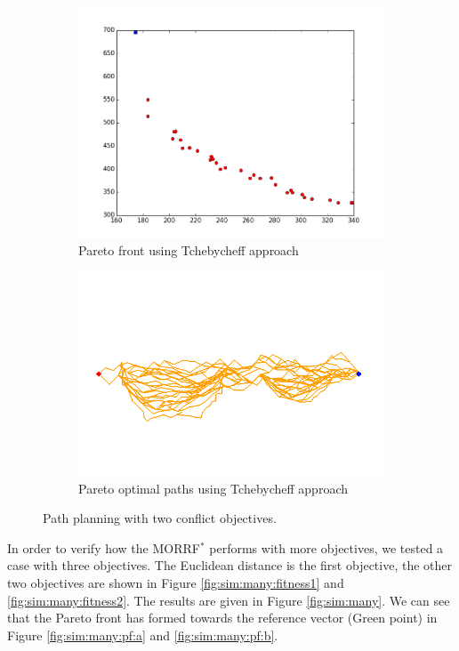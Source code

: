 \documentclass[conference]{IEEEtran}
\begin{document}
\begin{figure}
\begin{subfigure}[b]{0.45\linewidth}
		\includegraphics[width=\textwidth]{fig/sim9-nconvex/PF03-MORRT2.png}
		\caption{Pareto front using Tchebycheff approach}
		\label{fig:sim:nonconvex:pf:b}
	\end{subfigure} 
	\begin{subfigure}[b]{0.45\linewidth}
		\centering
		\includegraphics[width=\textwidth]{fig/sim9-nconvex/MORRTstar03-ALL.png}
		\caption{Pareto optimal paths using Tchebycheff approach}
		\label{fig:sim:nonconvex:sols:b}
	\end{subfigure}
	\caption{Path planning with two conflict objectives.}
	\label{fig:sim:nonconvex}
\end{figure}

In order to verify how the MORRF$^{*}$ performs with more objectives, we tested a case with three objectives.
The Euclidean distance is the first objective, the other two objectives are shown in Figure \ref{fig:sim:many:fitness1} and \ref{fig:sim:many:fitness2}.
The results are given in Figure \ref{fig:sim:many}.
We can see that the Pareto front has formed towards the reference vector (Green point) in Figure \ref{fig:sim:many:pf:a} and \ref{fig:sim:many:pf:b}.
\end{document}
